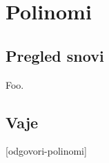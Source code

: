 \chapter{Polinomi}
\label{cha:polinomi}

\section{Pregled snovi}
\label{sec:polinomi-pregled-snovi}

Foo.

\section{Vaje}
\label{sec:polinomi-funkcije-vaje}


\def\datotekaOdgovori{odgovori-polinomi}

[\datotekaOdgovori]


